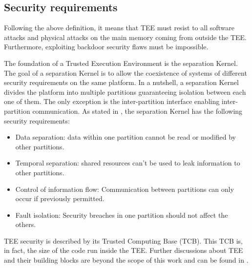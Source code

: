 \documentclass[../main.tex]{subfiles}
\begin{document}
\subsection{Security requirements}
\label{section:theoric:tee_security}
\par Following the above definition, it means that TEE must resist to all software attacks and physical attacks on the main memory coming from outside the TEE. Furthermore, exploiting backdoor security flaws must be impossible.
\par The foundation of a Trusted Execution Environment is the separation Kernel. The goal of a separation Kernel is to allow the coexistence of systems of different security requirements on the same platform. In a nutshell, a separation Kernel divides the platform into multiple partitions guaranteeing isolation between each one of them. The only exception is the inter-partition interface enabling inter-partition communication. As stated in \cite{Sabt2015TrustedEE}, the separation Kernel has the following security requirements:
\begin{itemize}
    \item Data separation: data within one partition cannot be read or modified by other partitions.
    \item Temporal separation: shared resources can't be used to leak information to other partitions.
    \item Control of information flow: Communication between partitions can only occur if previously permitted.
    \item Fault isolation: Security breaches in one partition should not affect the others.
\end{itemize}
\par TEE security is described by its Trusted Computing Base (TCB). This TCB is, in fact, the size of the code run inside the TEE. Further discussions about TEE and their building blocks are beyond the scope of this work and can be found in \cite{Sabt2015TrustedEE}.


\end{document}

